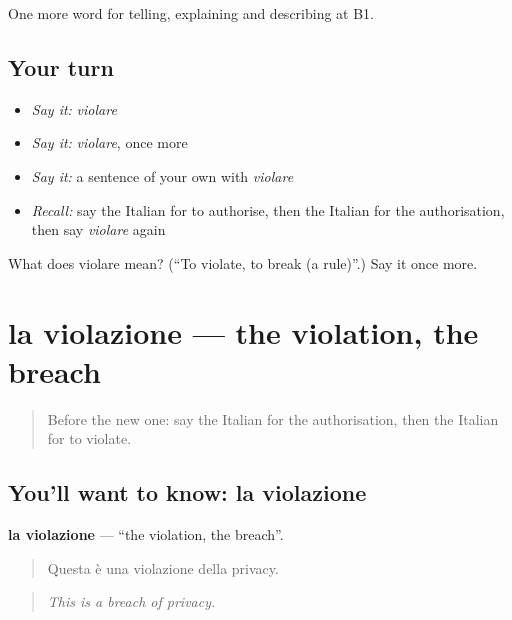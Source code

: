 \begin{grammarlens}[title={What you've built}]
One more word for telling, explaining and describing at B1.
\end{grammarlens}

\subsection*{Your turn}
\begin{itemize}
\raggedright
  \item \emph{Say it:} \emph{violare}
  \item \emph{Say it:} \emph{violare}, once more
  \item \emph{Say it:} a sentence of your own with \emph{violare}
  \item \emph{Recall:} say the Italian for to authorise, then the Italian for the authorisation, then say \emph{violare} again
\end{itemize}

\begin{tcolorbox}[breakable,colback=teal!4,colframe=teal!35!black,title={Before you move on}]
What does violare mean? (\textquotedblleft{}To violate, to break (a rule)\textquotedblright{}.) Say it once more.
\end{tcolorbox}
\section[la violazione]{la violazione — the violation, the breach}

\label{lesson:IT-C386-violazione}



\begin{quote}
Before the new one: say the Italian for the authorisation, then the Italian for to violate.
\end{quote}

\subsection*{You'll want to know: la violazione}
\textbf{la violazione} — \textquotedblleft{}the violation, the breach\textquotedblright{}.

\begin{quote}
Questa è una violazione della privacy.
\end{quote}

\begin{quote}
\emph{This is a breach of privacy.}
\end{quote}

